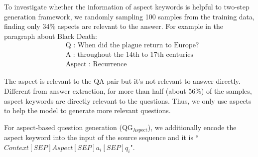 To investigate whether the information of aspect keywords is helpful to two-step generation framework,
we randomly sampling 100 samples from the training data, 
finding only 34\% aspects are relevant to the answer. 
For example in the paragraph about Black Death:
\begin{equation*}
\begin{split}
&\text{Q : When did the plague return to Europe?} \\
&\text{A : throughout the 14th to 17th centuries} \\
&\text{Aspect : Recurrence}
\end{split}
\end{equation*}

The aspect is relevant to the QA pair but it’s not relevant to answer directly. Different from answer extraction, for more than half (about 56\%) of the samples, aspect keywords are directly relevant to the questions.
Thus, we only use aspects to help the model to generate more relevant questions.

For aspect-based question generation (QG$_{\text{Aspect}}$), we additionally encode the aspect keyword into the input of the source sequence and it is ``${Context [SEP] Aspect [SEP] a_i [SEP] q_i}$".
%
%

